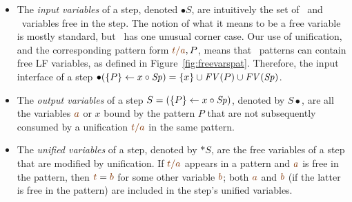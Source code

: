 \smallskip
\begin{itemize}
\item The {\it input variables} of a step, denoted ${\bullet}S$, are
  intuitively the set of \lf~and \sls~variables free in the step. The
  notion of what it means to be a free variable is mostly standard,
  but \sls~has one unusual corner case. Our use of unification, and
  the corresponding pattern form $\lf{t/a}, P$, means that
  \sls~patterns can contain free LF variables, as defined in
  Figure~\ref{fig:freevarspat}.  Therefore, the input interface of a
  step ${\bullet}(\{{P}\} \leftarrow {x} \circ {{\it Sp}}) = \{ x \} \cup {\it FV}(P) \cup
  {\it FV}({\it Sp})$.


\item The {\it output variables} of a step $S = (\{{P}\} \leftarrow {x} \circ {{\it Sp}})$,
  denoted by $S{\bullet}$, are all the variables $\lf{a}$ or $x$ bound
  by the pattern $P$ that are not subsequently consumed by a
  unification $\lf{t/a}$ in the same pattern.

\item The {\it unified variables} of a step, denoted by ${\ast}S$, are
  the free variables of a step that are modified by unification. If
  $\lf{t/a}$ appears in a pattern and $\lf{a}$ is free in the pattern,
  then $\lf{t} = \lf{b}$ for some other variable $\lf{b}$; both
  $\lf{a}$ and $\lf{b}$ (if the latter is free in the pattern) are
  included in the step's unified variables.
\end{itemize}
\smallskip


